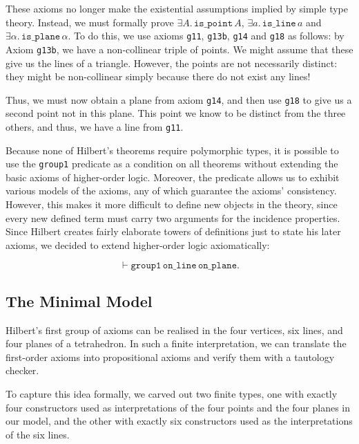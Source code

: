 These axioms no longer make the existential assumptions implied by simple type theory. Instead, we must formally prove $\exists A.\,\texttt{is\_point}\,A$, $\exists a.\,\texttt{is\_line}\,a$ and $\exists \alpha.\,\texttt{is\_plane}\,\alpha$. To do this, we use axioms \texttt{g11}, \texttt{g13b}, \texttt{g14} and \texttt{g18} as follows: by Axiom \texttt{g13b}, we have a non-collinear triple of points. We might assume that these give us the lines of a triangle. However, the points are not necessarily distinct: they might be non-collinear simply because there do not exist any lines!

Thus, we must now obtain a plane from axiom \texttt{g14}, and then use \texttt{g18} to give us a second point not in this plane. This point we know to be distinct from the three others, and thus, we have a line from \texttt{g11}.

Because none of Hilbert's theorems require polymorphic types, it is possible to use the \texttt{group1} predicate as a condition on all theorems without extending the basic axioms of higher-order logic. Moreover, the predicate allows us to exhibit various models of the axioms, any of which guarantee the axioms' consistency. However, this makes it more difficult to define new objects in the theory, since every new defined term must carry two arguments for the incidence properties. Since Hilbert creates fairly elaborate towers of definitions just to state his later axioms, we decided to extend higher-order logic axiomatically:

\begin{displaymath}
\vdash \texttt{group1}\,\texttt{on\_line}\,\texttt{on\_plane}.
\end{displaymath}

\subsection{The Minimal Model}\label{sec:GroupIModels}
Hilbert's first group of axioms can be realised in the four vertices, six lines, and four planes of a tetrahedron. In such a finite interpretation, we can translate the first-order axioms into propositional axioms and verify them with a tautology checker.

To capture this idea formally, we carved out two finite types, one with exactly four constructors used as interpretations of the four points and the four planes in our model, and the other with exactly six constructors used as the interpretations of the six lines.


